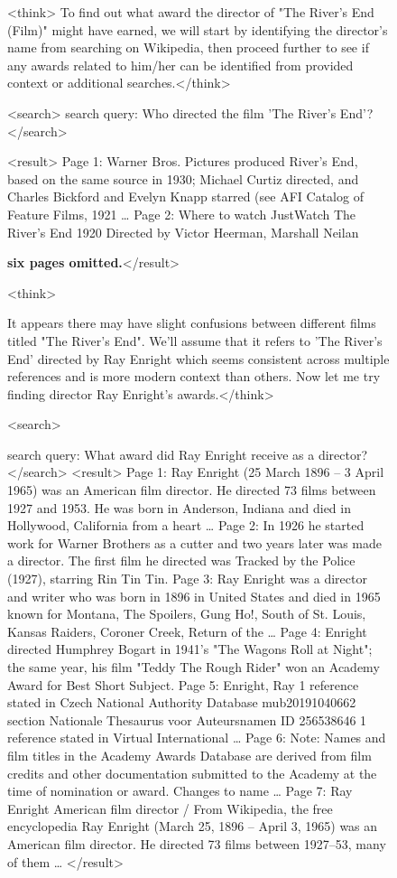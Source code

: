\documentclass{article}
\begin{document}
\begin{figure}[h]
\centering
 
\begin{tcolorbox}[
    colback=gray!5!white, 
    colframe=brown!75!brown, 
    title=Case-4 (Tool-Star RL Dataset): what award the director of "The River's End (Film)" might have earned?, 
    boxrule=0.3mm, 
    width=\linewidth,  
    arc=2mm, 
    auto outer arc=true
] 

<think> To find out what award the director of "The River's End (Film)" might have earned, we will start by identifying the director's name from searching on Wikipedia, then proceed further to see if any awards related to him/her can be identified from provided context or additional searches.</think>

<search> search query: Who directed the film 'The River's End'?</search>

<result>
Page 1: Warner Bros. Pictures produced River's End, based on the same source in 1930; Michael Curtiz directed, and Charles Bickford and Evelyn Knapp starred (see AFI Catalog of Feature Films, 1921 …
Page 2: Where to watch JustWatch The River's End 1920 Directed by Victor Heerman, Marshall Neilan

\textbf{six pages omitted.}</result>  

<think> 

It appears there may have slight confusions between different films titled "The River's End". We'll assume that it refers to 'The River's End' directed by Ray Enright which seems consistent across multiple references and is more modern context than others. Now let me try finding director Ray Enright’s awards.</think>  

<search> 

search query: What award did Ray Enright receive as a director?</search> <result>
Page 1: Ray Enright (25 March 1896 – 3 April 1965) was an American film director. He directed 73 films between 1927 and 1953. He was born in Anderson, Indiana and died in Hollywood, California from a heart …
Page 2: In 1926 he started work for Warner Brothers as a cutter and two years later was made a director. The first film he directed was Tracked by the Police (1927), starring Rin Tin Tin.
Page 3: Ray Enright was a director and writer who was born in 1896 in United States and died in 1965 known for Montana, The Spoilers, Gung Ho!, South of St. Louis, Kansas Raiders, Coroner Creek, Return of the …
Page 4: Enright directed Humphrey Bogart in 1941's "The Wagons Roll at Night"; the same year, his film "Teddy The Rough Rider" won an Academy Award for Best Short Subject.
Page 5: Enright, Ray 1 reference stated in Czech National Authority Database mub20191040662 section Nationale Thesaurus voor Auteursnamen ID 256538646 1 reference stated in Virtual International …
Page 6: Note: Names and film titles in the Academy Awards Database are derived from film credits and other documentation submitted to the Academy at the time of nomination or award. Changes to name …
Page 7: Ray Enright American film director / From Wikipedia, the free encyclopedia Ray Enright (March 25, 1896 – April 3, 1965) was an American film director. He directed 73 films between 1927–53, many of them …
</result>  


\end{tcolorbox}
\end{figure}
\end{document}
